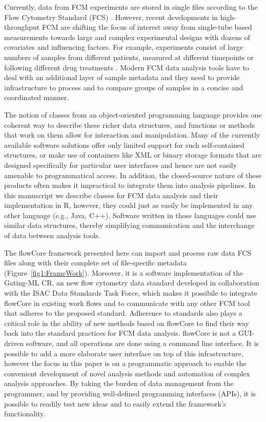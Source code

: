 \documentclass[12pt]{article}
\newcommand{\Rpackage}[1]{{\textsf{#1}}}
\begin{document}
Currently, data from FCM experiments are stored in single files
according to the Flow Cytometry Standard (FCS) \citep{seamer1997pnd}.
However, recent developments in high-throughput FCM are shifting the
focus of interest away from single-tube based measurements towards
large and complex experimental designs with dozens of covariates and
influencing factors. For example, experiments consist of large numbers
of samples from different patients, measured at different timepoints
\citep{brinkman2007hcf} or following different drug treatments
\citep{gasparetto2004ice}. Modern FCM data analysis tools have to deal
with an additional layer of sample metadata and they need to provide
infrastructure to process and to compare groups of samples in a
concise and coordinated manner.

The notion of classes from an object-oriented programming language
provides one coherent way to describe these richer data structures,
and functions or methods that work on them allow for interaction and
manipulation. Many of the currently available software solutions offer
only limited support for such self-contained structures, or make use
of containers like XML or binary storage formats that are designed
specifically for particular user interfaces and hence are not easily
amenable to programmatical access. In addition, the closed-source
nature of these products often makes it impractical to integrate them
into analysis pipelines. In this manuscript we describe classes for
FCM data analysis and their implementation in R, however, they could
just as easily be implemented in any other language (e.g., Java,
C++). Software written in those languages could use similar data
structures, thereby simplifying communication and the interchange of
data between analysis tools.

The \Rpackage{flowCore} framework presented here can import and
process raw data FCS files along with their complete set of
file-specific metadata (Figure~\ref{fig1:FrameWork}).  Moreover, it is
a software implementation of the Gating-ML CR, an new flow
cytometry data standard developed in collaboration with the ISAC Data
Standards Task Force, which makes it possibile to integrate
\Rpackage{flowCore} in existing work flows and to communicate with any
other FCM tool that adheres to the proposed standard\citep{SpidlenInPressCytometryA}. Adherence to
standards also plays a critical role in the ability of new methods
based on \Rpackage{flowCore} to find their way back into the standard
practices for FCM data analysis. \Rpackage{flowCore} is not a
GUI-driven software, and all operations are done using a command line
interface.  It is possible to add a more elaborate user interface on
top of this infrastructure, however the focus in this paper is on a
programmatic approach to enable the convenient development of novel
analysis methods and automation of complex analysis approaches.  By
taking the burden of data management from the programmer, and by
providing well-defined programming interfaces (APIs), it is possible
to readily test new ideas and to easily extend the framework's
functionality.
\end{document}
